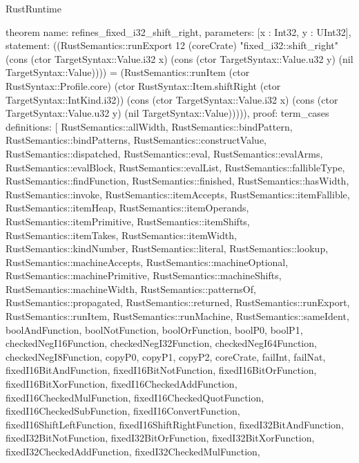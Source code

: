 \begin{lexlean}{RustRuntime}
\begin{semanticmodule}
theorem{
  name: refines_fixed_i32_shift_right,
  parameters: [x : Int32, y : UInt32],
  statement: ((RustSemantics::runExport 12 (coreCrate) "fixed_i32::shift_right" (cons (ctor TargetSyntax::Value.i32 x) (cons (ctor TargetSyntax::Value.u32 y) (nil TargetSyntax::Value)))) = (RustSemantics::runItem (ctor RustSyntax::Profile.core) (ctor RustSyntax::Item.shiftRight (ctor TargetSyntax::IntKind.i32)) (cons (ctor TargetSyntax::Value.i32 x) (cons (ctor TargetSyntax::Value.u32 y) (nil TargetSyntax::Value))))),
  proof: term_cases{
    definitions: [
      RustSemantics::allWidth,
      RustSemantics::bindPattern,
      RustSemantics::bindPatterns,
      RustSemantics::constructValue,
      RustSemantics::dispatched,
      RustSemantics::eval,
      RustSemantics::evalArms,
      RustSemantics::evalBlock,
      RustSemantics::evalList,
      RustSemantics::fallibleType,
      RustSemantics::findFunction,
      RustSemantics::finished,
      RustSemantics::hasWidth,
      RustSemantics::invoke,
      RustSemantics::itemAccepts,
      RustSemantics::itemFallible,
      RustSemantics::itemHeap,
      RustSemantics::itemOperands,
      RustSemantics::itemPrimitive,
      RustSemantics::itemShifts,
      RustSemantics::itemTakes,
      RustSemantics::itemWidth,
      RustSemantics::kindNumber,
      RustSemantics::literal,
      RustSemantics::lookup,
      RustSemantics::machineAccepts,
      RustSemantics::machineOptional,
      RustSemantics::machinePrimitive,
      RustSemantics::machineShifts,
      RustSemantics::machineWidth,
      RustSemantics::patternsOf,
      RustSemantics::propagated,
      RustSemantics::returned,
      RustSemantics::runExport,
      RustSemantics::runItem,
      RustSemantics::runMachine,
      RustSemantics::sameIdent,
      boolAndFunction,
      boolNotFunction,
      boolOrFunction,
      boolP0,
      boolP1,
      checkedNegI16Function,
      checkedNegI32Function,
      checkedNegI64Function,
      checkedNegI8Function,
      copyP0,
      copyP1,
      copyP2,
      coreCrate,
      failInt,
      failNat,
      fixedI16BitAndFunction,
      fixedI16BitNotFunction,
      fixedI16BitOrFunction,
      fixedI16BitXorFunction,
      fixedI16CheckedAddFunction,
      fixedI16CheckedMulFunction,
      fixedI16CheckedQuotFunction,
      fixedI16CheckedSubFunction,
      fixedI16ConvertFunction,
      fixedI16ShiftLeftFunction,
      fixedI16ShiftRightFunction,
      fixedI32BitAndFunction,
      fixedI32BitNotFunction,
      fixedI32BitOrFunction,
      fixedI32BitXorFunction,
      fixedI32CheckedAddFunction,
      fixedI32CheckedMulFunction,
}}
\end{semanticmodule}
\end{lexlean}
